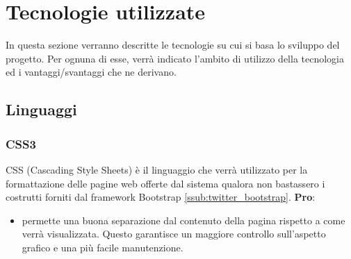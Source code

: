 %


\section{Tecnologie utilizzate} %
\label{sec:tecnologie_utilizzate}
In questa sezione verranno descritte le tecnologie su cui si basa lo sviluppo del progetto. Per ognuna di esse, verrà indicato l’ambito di utilizzo della tecnologia ed i vantaggi/svantaggi che ne derivano.

	\subsection{Linguaggi} %
	\label{sub:linguaggi}
		\subsubsection{CSS3} %
		\label{ssub:css}
		CSS (Cascading Style Sheets) è il linguaggio che verrà utilizzato per la formattazione delle pagine web offerte dal sistema qualora non bastassero i costrutti forniti dal framework Bootstrap \ref{ssub:twitter_bootstrap}. \newline
		\textbf{Pro}:
			\begin{itemize}
				\item permette una buona separazione dal contenuto della pagina rispetto a come verrà visualizzata. Questo garantisce un maggiore controllo sull'aspetto grafico e una più facile manutenzione.
			\end{itemize}

